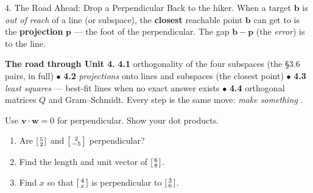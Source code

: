 \documentclass[10pt]{article}
\newcommand{\vv}{\mathbf{v}}
\newcommand{\ww}{\mathbf{w}}
\newcommand{\bb}{\mathbf{b}}
\newcommand{\pp}{\mathbf{p}}
\begin{document}
\begin{notesbox}{4. The Road Ahead: Drop a Perpendicular}
Back to the hiker. When a target $\bb$ is \emph{out of reach} of a line (or subspace), the
\textbf{closest} reachable point $\bb$ can get to is the \textbf{projection} $\pp$ --- the foot of
the perpendicular. The gap $\bb-\pp$ (the \emph{error}) is \blank{3.0cm} to the line.

\begin{center}
\end{center}

\textbf{The road through Unit 4.} \textbf{4.1} orthogonality of the four subspaces (the §3.6 pairs,
in full)\; $\bullet$\; \textbf{4.2} \emph{projections} onto lines and subspaces (the closest
point)\; $\bullet$\; \textbf{4.3} \emph{least squares} --- best-fit lines when no exact answer
exists\; $\bullet$\; \textbf{4.4} orthogonal matrices $Q$ and Gram--Schmidt. Every step is the same
move: \emph{make something} \blank{2.6cm}.
\end{notesbox}

\begin{practicebox}
Use $\vv\cdot\ww=0$ for perpendicular. Show your dot products.
\begin{enumerate}[leftmargin=1.6em, itemsep=4pt]
  \item Are $\begin{bsmallmatrix} 5\\2 \end{bsmallmatrix}$ and $\begin{bsmallmatrix} 2\\-5 \end{bsmallmatrix}$ perpendicular? \writeline
  \item Find the length and unit vector of $\begin{bsmallmatrix} 6\\8 \end{bsmallmatrix}$. \writeline
  \item Find $x$ so that $\begin{bsmallmatrix} 4\\x \end{bsmallmatrix}$ is perpendicular to $\begin{bsmallmatrix} 3\\6 \end{bsmallmatrix}$. \writeline
\end{enumerate}
\end{practicebox}
\end{document}
